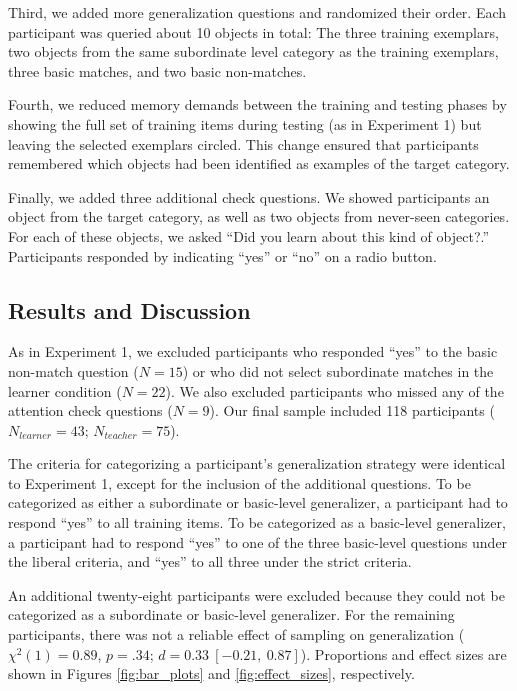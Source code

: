 \documentclass[man]{apa2}
\begin{document}
Third, we added more generalization questions and randomized their order. Each participant was queried about 10 objects in total: The three training exemplars, two objects from the same subordinate level category as the training exemplars, three basic matches, and two basic non-matches. 

Fourth, we reduced memory demands between the training and testing phases by showing the full set of training items during testing (as in Experiment 1) but leaving the selected exemplars circled. This change ensured that participants remembered which objects had been identified as examples of the target category. 

Finally, we added three additional check questions. We showed participants an object from the target category, as well as two objects from never-seen categories. For each of these objects, we asked ``Did you learn about this kind of object?.'' Participants responded by indicating ``yes'' or ``no'' on a radio button.

\subsection{Results and Discussion}
As in Experiment 1, we excluded participants who responded ``yes'' to the basic non-match question ($N=15$) or who did not select subordinate matches in the learner condition ($N = 22$). We also excluded participants who missed any of the attention check questions ($N = 9$). Our final sample included 118 participants ($N_{learner} = 43$; $N_{teacher} = 75$).

The criteria for categorizing a participant's generalization strategy were identical to Experiment 1, except for the inclusion of the additional questions. To be categorized as either a subordinate or basic-level generalizer, a participant had to respond ``yes'' to all training items. To be categorized as a basic-level generalizer, a participant had to respond ``yes'' to one of the three basic-level questions under the liberal criteria, and ``yes'' to all three under the strict criteria. 

An additional twenty-eight participants were excluded because they could not be categorized as a subordinate or basic-level generalizer. For the remaining participants, there was not a reliable effect of sampling on generalization ($\chi^2(1) = 0.89$, $p = .34$; $d = 0.33\ [-0.21,\ 0.87]$). Proportions and effect sizes are shown in Figures \ref{fig:bar_plots} and \ref{fig:effect_sizes}, respectively.
\end{document}
